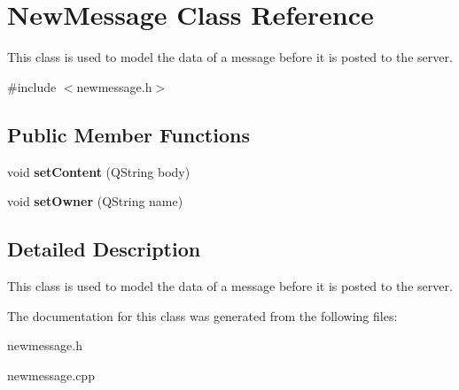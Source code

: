 \hypertarget{classNewMessage}{\section{New\-Message Class Reference}
\label{classNewMessage}
}


This class is used to model the data of a message before it is posted to the server.  




{\ttfamily \#include $<$newmessage.\-h$>$}

\subsection*{Public Member Functions}
\begin{DoxyCompactItemize}
\item 
\hypertarget{classNewMessage_a773fd0b0f79708c8f368e615711c696c}{void {\bfseries set\-Content} (Q\-String body)}\label{classNewMessage_a773fd0b0f79708c8f368e615711c696c}

\item 
\hypertarget{classNewMessage_a9660f536eacf3c6c2a04bc5ba883f8fa}{void {\bfseries set\-Owner} (Q\-String name)}\label{classNewMessage_a9660f536eacf3c6c2a04bc5ba883f8fa}

\end{DoxyCompactItemize}


\subsection{Detailed Description}
This class is used to model the data of a message before it is posted to the server. 

The documentation for this class was generated from the following files\-:\begin{DoxyCompactItemize}
\item 
newmessage.\-h\item 
newmessage.\-cpp\end{DoxyCompactItemize}
